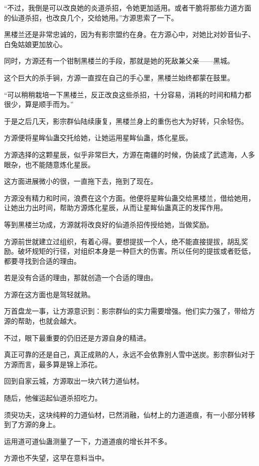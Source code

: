\begin{this_body}
“不过，我倒是可以改良她的炎道杀招，令她更加适用。或者干脆将那些力道方面的仙道杀招，也改良几个，交给她用。”方源思索了一下。

黑楼兰还是非常忠诚的，因为有影宗盟约在身。在方源心中，对她比对妙音仙子、白兔姑娘更加放心。

同时，方源还有一个钳制黑楼兰的手段，那就是她的死敌兼父亲——黑城。

这个巨大的杀手锏，方源一直捏在自己的手心里，黑楼兰始终都蒙在鼓里。

“可以稍稍栽培一下黑楼兰，反正改良这些杀招，十分容易，消耗的时间和精力都很少，算是顺手而为。”

于是之后几天，影宗群仙陆续康复，黑楼兰身上的重伤也大为好转，只余轻伤。

方源便将星眸仙蛊交托给她，让她运用星眸仙蛊，炼化星辰。

方源选择的这颗星辰，似乎非常巨大，方源在南疆的时候，伪装成了武遗海，人多眼杂，也不能随意炼化星辰。

这方面进展微小的很，一直拖下去，拖到了现在。

方源没有精力和时间，浪费在这个方面。他便将星眸仙蛊交给黑楼兰，借给她用，让她出力出时间，帮助方源炼化星辰，从而让星眸仙蛊真正的发挥作用。

等到黑楼兰功成，方源就将改良好的仙道杀招传授给她，当做奖励。

方源前世就建立过组织，有着心得。要想提拔一个人，绝不能直接提拔，胡乱奖励。破坏规矩的行径，对组织本身是一种巨大的伤害。所以任何的提拔或者贬低，都要寻找到合适的理由。

若是没有合适的理由，那就创造一个合适的理由。

方源在这方面也是驾轻就熟。

万首盘龙一事，让方源意识到：影宗群仙的实力需要增强。他们实力强了，带给方源的帮助，也就会越大。

不过，眼下最重要的仍旧还是方源自身的精进。

真正可靠的还是自己，真正成熟的人，永远不会依靠别人雪中送炭。影宗群仙对于方源而言，最多算是锦上添花。

回到自家云城，方源取出一块六转力道仙材。

随后，他催运起仙道杀招吃力。

须臾功夫，这块纯粹的力道仙材，已然消融，仙材上的力道道痕，有一小部分转移到了方源的身上。

运用道可道仙蛊测量了一下，力道道痕的增长并不多。

方源也不失望，这早在意料当中。


\end{this_body}
